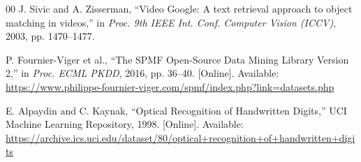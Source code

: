 \documentclass[conference]{IEEEtran}
\begin{document}
\begin{thebibliography}{00}
 J. Sivic and A. Zisserman, ``Video Google: A text retrieval approach to object matching in videos,'' in \textit{Proc. 9th IEEE Int. Conf. Computer Vision (ICCV)}, 2003, pp. 1470--1477.

 P. Fournier-Viger et al., ``The SPMF Open-Source Data Mining Library Version 2,'' in \textit{Proc. ECML PKDD}, 2016, pp. 36--40. [Online]. Available: \url{https://www.philippe-fournier-viger.com/spmf/index.php?link=datasets.php}

 E. Alpaydin and C. Kaynak, ``Optical Recognition of Handwritten Digits,'' UCI Machine Learning Repository, 1998. [Online]. Available: \url{https://archive.ics.uci.edu/dataset/80/optical+recognition+of+handwritten+digits}

\end{thebibliography}
\end{document}
